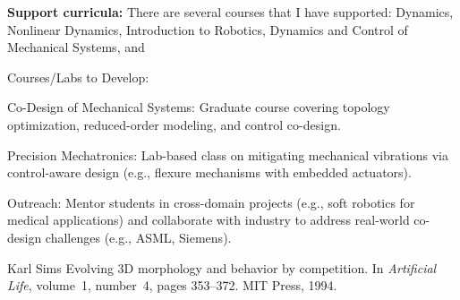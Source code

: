 \documentclass[12pt]{article}
\begin{document}
\textbf{Support curricula:} There are several courses that I have supported: Dynamics, Nonlinear Dynamics, Introduction to Robotics, Dynamics and Control of Mechanical Systems, and 


Courses/Labs to Develop:

    Co-Design of Mechanical Systems: Graduate course covering topology optimization, reduced-order modeling, and control co-design.

    Precision Mechatronics: Lab-based class on mitigating mechanical vibrations via control-aware design (e.g., flexure mechanisms with embedded actuators).

Outreach:
    Mentor students in cross-domain projects (e.g., soft robotics for medical applications) and collaborate with industry to address real-world co-design challenges (e.g., ASML, Siemens).

  


\begin{thebibliography}{1}

Karl Sims
\newblock Evolving 3D morphology and behavior by competition.
\newblock In {\em Artificial Life}, volume~1, number~4, pages 353--372. 
MIT Press, 1994.


\end{thebibliography}
\end{document}
